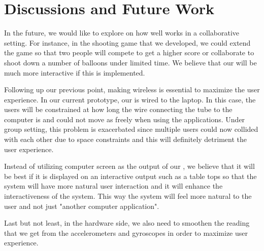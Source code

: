 \section{Discussions and Future Work}\label{sec:fut-work}
In the future, we would like to explore on how well \tube works in a collaborative setting. For instance, in the shooting game that we developed, we could extend the game so that two people will compete to get a higher score or collaborate to shoot down a number of balloons under limited time. We believe that our \tube will be much more interactive if this is implemented.

Following up our previous point, making \tube wireless is essential to maximize the user experience. In our current prototype, our \tube is wired to the laptop. In this case, the users will be constrained at how long the wire connecting the tube to the computer is and could not move as freely when using the applications. Under group setting, this problem is exacerbated since multiple users could now collided with each other due to space constraints and this will definitely detriment the user experience.

Instead of utilizing computer screen as the output of our \tube, we believe that it will be best if it is displayed on an interactive output such as a table tops so that the \tube system will have more natural user interaction and it will enhance the interactiveness of the system. This way the \tube system will feel more natural to the user and not just "another computer application".

Last but not least, in the hardware side, we also need to smoothen the reading that we get from the accelerometers and gyroscopes in order to maximize user experience.

